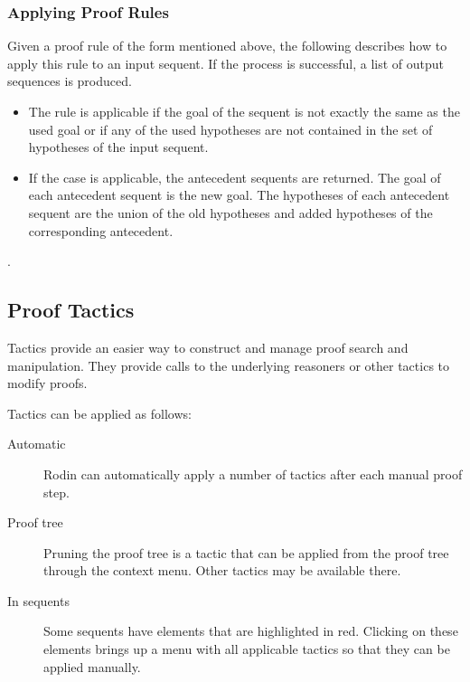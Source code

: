 \subsubsection{Applying Proof Rules}

Given a proof rule of the form mentioned above, the following describes how to apply this rule to an input sequent. If the process is successful, a list of output sequences is produced. 

\begin{itemize}
	\item The rule is applicable if the goal of the sequent is not exactly the same as the used goal or if any of the used hypotheses are not contained in the set of hypotheses of the input sequent. 
	\item If the case is applicable, the antecedent sequents are returned. The goal of each antecedent sequent is the new goal. The hypotheses of each antecedent sequent are the union of the old hypotheses and added hypotheses of the corresponding antecedent. 
\end{itemize}

.

\subsection{Proof Tactics}
\label{proof_tactics}

Tactics provide an easier way to construct and manage proof search and manipulation. They provide calls to the underlying reasoners or other tactics to modify proofs.


Tactics can be applied as follows:

\begin{description}
	\item[Automatic] Rodin can automatically apply a number of tactics after each manual proof step.
	\item[Proof tree] Pruning the proof tree is a tactic that can be applied from the proof tree through the context menu.  Other tactics may be available there.
	\item[In sequents] Some sequents have elements that are highlighted in red.  Clicking on these elements brings up a menu with all applicable tactics so that they can be applied manually.
\end{description}

